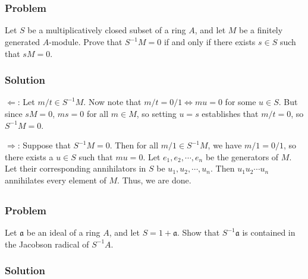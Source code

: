 \documentclass[book,12pt,oneside,openany]{memoir}
\begin{document}
\chapter{}

\section{}
\subsection{Problem}
Let $S$ be a multiplicatively closed subset of a ring $A$, and let $M$ be a finitely generated $A$-module. Prove that $S^{-1}M = 0$ if and only if there exists $s \in S$ such that $sM = 0$.

\subsection{Solution}
$\Leftarrow$: Let $m/t \in S^{-1}M$. Now note that $m/t  = 0/1 \Leftrightarrow mu = 0$ for some $u \in S$. But since $sM = 0$, $ms = 0$ for all $m \in M$, so setting $u = s$ establishes that $m/t = 0$, so $S^{-1}M = 0$.

$\Rightarrow$: Suppose that $S^{-1}M = 0$. Then for all $m/1 \in S^{-1}M$, we have $m/1 = 0/1$, so there exists a $u \in S$ such that $mu = 0$. Let $e_1, e_2, \cdots, e_n$ be the generators of $M$. Let their corresponding annihilators in $S$ be $u_1, u_2, \cdots, u_n$. Then $u_1 u_2 \cdots u_n$ annihilates every element of $M$. Thus, we are done.

\section{}
\subsection{Problem}
Let $\mathfrak{a}$ be an ideal of a ring $A$, and let $S = 1 + \mathfrak{a}$. Show that $S^{-1}\mathfrak{a}$ is contained in the Jacobson radical of $S^{-1}A$. 

\subsection{Solution}
\end{document}
